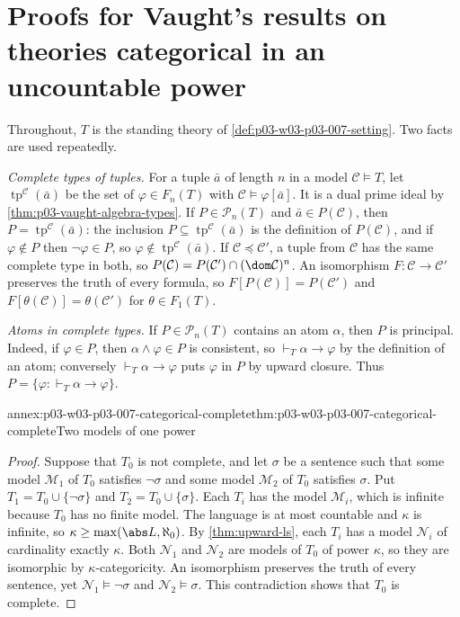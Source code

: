 \section{Proofs for Vaught's results on theories categorical in an uncountable power}
\label{sec:annex-p03-w03-p03-007-vaught-categorical}

Throughout, \(T\) is the standing theory of
\cref{def:p03-w03-p03-007-setting}. Two facts are used repeatedly.

\emph{Complete types of tuples.} For a tuple \(\bar a\) of length \(n\) in a
model \(\mathcal C\models T\), let \(\operatorname{tp}^{\mathcal C}(\bar a)\)
be the set of \(\varphi\in F_n(T)\) with \(\mathcal C\models\varphi[\bar a]\).
It is a dual prime ideal by \cref{thm:p03-vaught-algebra-types}. If
\(P\in\mathcal P_n(T)\) and \(\bar a\in P(\mathcal C)\), then
\(P=\operatorname{tp}^{\mathcal C}(\bar a)\): the inclusion
\(P\subseteq\operatorname{tp}^{\mathcal C}(\bar a)\) is the definition of
\(P(\mathcal C)\), and if \(\varphi\notin P\) then \(\neg\varphi\in P\), so
\(\varphi\notin\operatorname{tp}^{\mathcal C}(\bar a)\). If
\(\mathcal C\preccurlyeq\mathcal C'\), a tuple from \(\mathcal C\) has the
same complete type in both, so \(P(\mathcal C)=P(\mathcal C')\cap(\dom\mathcal C)^n\).
An isomorphism \(F\colon\mathcal C\to\mathcal C'\) preserves the truth of
every formula, so \(F[P(\mathcal C)]=P(\mathcal C')\) and
\(F[\theta(\mathcal C)]=\theta(\mathcal C')\) for \(\theta\in F_1(T)\).

\emph{Atoms in complete types.} If \(P\in\mathcal P_n(T)\) contains an atom
\(\alpha\), then \(P\) is principal. Indeed, if \(\varphi\in P\), then
\(\alpha\land\varphi\in P\) is consistent, so \(\vdash_T\alpha\to\varphi\) by
the definition of an atom; conversely \(\vdash_T\alpha\to\varphi\) puts
\(\varphi\) in \(P\) by upward closure. Thus
\(P=\{\varphi:\vdash_T\alpha\to\varphi\}\).

\begin{annexitem}{annex:p03-w03-p03-007-categorical-complete}{thm:p03-w03-p03-007-categorical-complete}{Two models of one power}
\begin{proof}
Suppose that \(T_0\) is not complete, and let \(\sigma\) be a sentence such
that some model \(\mathcal M_1\) of \(T_0\) satisfies \(\neg\sigma\) and some
model \(\mathcal M_2\) of \(T_0\) satisfies \(\sigma\). Put
\(T_1=T_0\cup\{\neg\sigma\}\) and \(T_2=T_0\cup\{\sigma\}\). Each \(T_i\) has
the model \(\mathcal M_i\), which is infinite because \(T_0\) has no finite
model. The language is at most countable and \(\kappa\) is infinite, so
\(\kappa\geq\max(\abs L,\aleph_0)\). By \cref{thm:upward-ls}, each \(T_i\) has
a model \(\mathcal N_i\) of cardinality exactly \(\kappa\). Both
\(\mathcal N_1\) and \(\mathcal N_2\) are models of \(T_0\) of power
\(\kappa\), so they are isomorphic by \(\kappa\)-categoricity. An isomorphism
preserves the truth of every sentence, yet \(\mathcal N_1\models\neg\sigma\)
and \(\mathcal N_2\models\sigma\). This contradiction shows that \(T_0\) is
complete.
\end{proof}
\end{annexitem}

